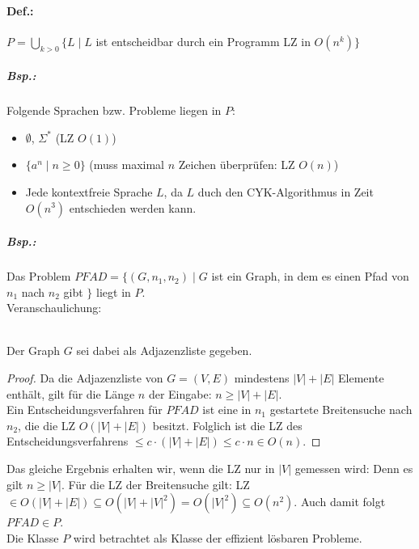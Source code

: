 \documentclass{scrreprt}
\begin{document}
\paragraph{Def.:} $P=\bigcup_{k>0} \{ L\;|\; L$ ist entscheidbar durch ein Programm LZ in $O(n^k)\}$
\subparagraph{Bsp.:} Folgende Sprachen bzw. Probleme liegen in $P$:
\begin{itemize}
\item $\emptyset$, $\Sigma^*$ (LZ $O(1)$)
\item $\{a^n\;| \; n\geq 0\}$ (muss maximal $n$ Zeichen überprüfen: LZ $O(n)$)
\item Jede kontextfreie Sprache $L$, da $L$ duch den CYK-Algorithmus in Zeit $O(n^3)$ entschieden werden kann.
\end{itemize}
\subparagraph{Bsp.:} Das Problem $PFAD=\{(G,n_1,n_2)\;|\; G$ ist ein Graph, in dem es einen Pfad von $n_1$ nach $n_2$ gibt $\}$ liegt in $P$.\\
Veranschaulichung:\\
\\
Der Graph $G$ sei dabei als Adjazenzliste gegeben.
\begin{proof}
Da die Adjazenzliste von $G=(V,E)$ mindestens $|V|+|E|$ Elemente enthält, gilt für die Länge $n$ der Eingabe: $n\geq |V|+|E|$.\\
Ein Entscheidungsverfahren für $PFAD$ ist eine in $n_1$ gestartete Breitensuche nach $n_2$, die die LZ $O(|V|+|E|)$ besitzt. Folglich ist die LZ des Entscheidungsverfahrens $\leq c \cdot (|V|+|E|) \leq c \cdot n \in O(n)$. 
\end{proof}
Das gleiche Ergebnis erhalten wir, wenn die LZ nur in $|V|$ gemessen wird: Denn es gilt $n \geq |V|$. Für die LZ der Breitensuche gilt: LZ$\in O(|V|+|E|)\subseteq O (|V|+|V|^2)=O(|V|^2)\subseteq O(n^2)$.  Auch damit folgt $PFAD \in P$.\medskip\\
Die Klasse $P$ wird betrachtet als Klasse der effizient lösbaren Probleme.
\end{document}
